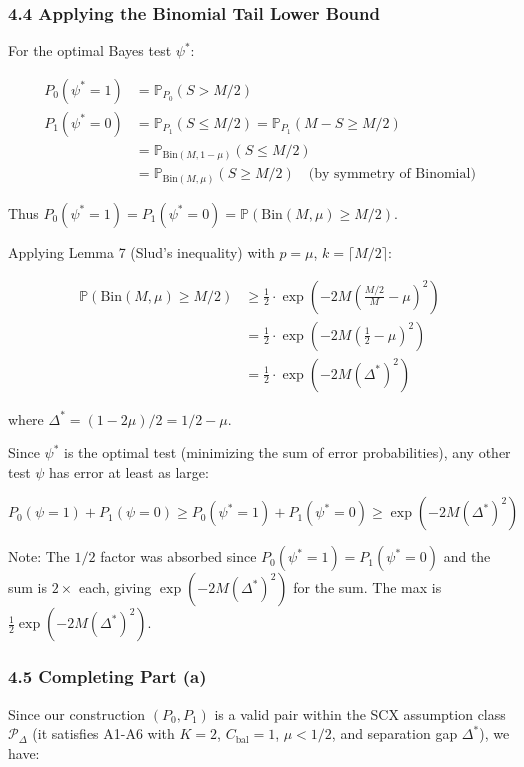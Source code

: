 \documentclass[
  12pt,
]{ctexart}
\begin{document}
\subsubsection{4.4 Applying the Binomial Tail Lower
Bound}\label{applying-the-binomial-tail-lower-bound}

For the optimal Bayes test \(\psi^*\):

\[\begin{aligned}
P_0(\psi^* = 1) &= \mathbb{P}_{P_0}(S > M/2) \\
P_1(\psi^* = 0) &= \mathbb{P}_{P_1}(S \leq M/2) = \mathbb{P}_{P_1}(M - S \geq M/2) \\
&= \mathbb{P}_{\text{Bin}(M,1-\mu)}(S \leq M/2) \\
&= \mathbb{P}_{\text{Bin}(M,\mu)}(S \geq M/2) \quad \text{(by symmetry of Binomial)}
\end{aligned}\]

Thus
\(P_0(\psi^*=1) = P_1(\psi^*=0) = \mathbb{P}(\text{Bin}(M,\mu) \geq M/2)\).

Applying Lemma 7 (Slud's inequality) with \(p = \mu\),
\(k = \lceil M/2 \rceil\):

\[\begin{aligned}
\mathbb{P}(\text{Bin}(M,\mu) \geq M/2) &\geq \frac{1}{2} \cdot \exp\!\left(-2M\left(\frac{M/2}{M} - \mu\right)^2\right) \\
&= \frac{1}{2} \cdot \exp\!\left(-2M\left(\frac{1}{2} - \mu\right)^2\right) \\
&= \frac{1}{2} \cdot \exp\!\left(-2M(\Delta^*)^2\right)
\end{aligned}\]

where \(\Delta^* = (1-2\mu)/2 = 1/2 - \mu\).

Since \(\psi^*\) is the optimal test (minimizing the sum of error
probabilities), any other test \(\psi\) has error at least as large:

\[P_0(\psi=1) + P_1(\psi=0) \geq P_0(\psi^*=1) + P_1(\psi^*=0) \geq \exp(-2M(\Delta^*)^2)\]

Note: The \(1/2\) factor was absorbed since
\(P_0(\psi^*=1) = P_1(\psi^*=0)\) and the sum is \(2 \times\) each,
giving \(\exp(-2M(\Delta^*)^2)\) for the sum. The max is
\(\frac{1}{2}\exp(-2M(\Delta^*)^2)\).

\subsubsection{4.5 Completing Part (a)}\label{completing-part-a}

Since our construction \((P_0, P_1)\) is a valid pair within the SCX
assumption class \(\mathcal{P}_\Delta\) (it satisfies A1-A6 with
\(K=2\), \(C_{\text{bal}}=1\), \(\mu < 1/2\), and separation gap
\(\Delta^*\)), we have:
\end{document}
